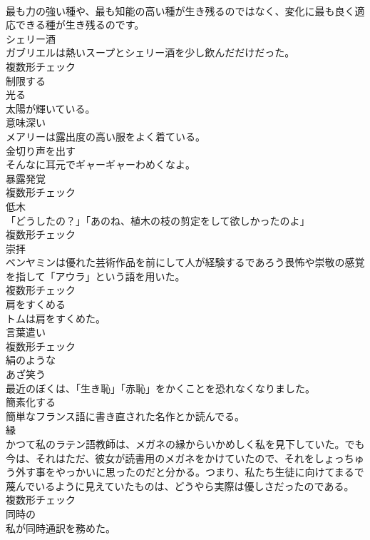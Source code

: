 \documentclass[8pt]{extreport}
\begin{document}
\begin{CJK}{UTF8}{min}
\\	最も力の強い種や、最も知能の高い種が生き残るのではなく、変化に最も良く適応できる種が生き残るのです。	
\\	[名詞]	シェリー酒	
\\	ガブリエルは熱いスープとシェリー酒を少し飲んだだけだった。	
\\	複数形チェック
\\	[形容詞]	制限する	
\\	[形容詞]	光る	
\\	太陽が輝いている。	
\\	[形容詞]	意味深い	
\\	メアリーは露出度の高い服をよく着ている。	
\\	[動詞]	金切り声を出す	
\\	そんなに耳元でギャーギャーわめくなよ。	
\\	[名詞]	暴露発覚	
\\	複数形チェック
\\	[名詞]	低木	
\\	「どうしたの？」「あのね、植木の枝の剪定をして欲しかったのよ」	
\\	複数形チェック
\\	[名詞]	崇拝	
\\	ベンヤミンは優れた芸術作品を前にして人が経験するであろう畏怖や崇敬の感覚を指して「アウラ」という語を用いた。	
\\	複数形チェック
\\	[動詞]	肩をすくめる	
\\	トムは肩をすくめた。	
\\	[名詞]	言葉遣い	
\\	複数形チェック
\\	[形容詞]	絹のような	
\\	[動詞]	あざ笑う	
\\	最近のぼくは、「生き恥」「赤恥」をかくことを恐れなくなりました。	
\\	[動詞]	簡素化する	
\\	簡単なフランス語に書き直された名作とか読んでる。	
\\	[名詞]	縁	
\\	かつて私のラテン語教師は、メガネの縁からいかめしく私を見下していた。でも今は、それはただ、彼女が読書用のメガネをかけていたので、それをしょっちゅう外す事をやっかいに思ったのだと分かる。つまり、私たち生徒に向けてまるで蔑んでいるように見えていたものは、どうやら実際は優しさだったのである。	
\\	複数形チェック
\\	[形容詞]	同時の	
\\	私が同時通訳を務めた。	

\end{CJK}
\end{document}
